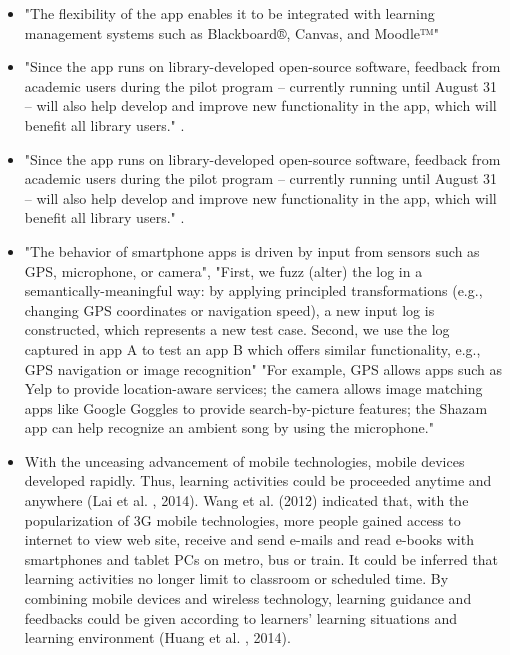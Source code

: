     \begin{itemize}
    
        \item
        "The flexibility of the app enables it to be integrated with learning management systems such as Blackboard®, Canvas, and Moodle™" \cite{campusM}
        \item
        "Since the app runs on library-developed open-source software, feedback from academic users during the pilot program – currently running until August 31 – will also help develop and improve new functionality in the app, which will benefit all library users." \cite{NYU_Library}.
        \item
        "Since the app runs on library-developed open-source software, feedback from academic users during the pilot program – currently running until August 31 – will also help develop and improve new functionality in the app, which will benefit all library users." \cite{NYU_Library}.
        \item 
        "The behavior of smartphone apps is driven by input from
        sensors such as GPS, microphone, or camera", 
        "First, we fuzz (alter) the log in a semantically-meaningful way: by applying 
        principled transformations (e.g., changing GPS coordinates
        or navigation speed), a new input log is constructed, which
        represents a new test case. Second, we use the log captured
        in app A to test an app B which offers similar functionality,
        e.g., GPS navigation or image recognition"
        "For example, GPS allows apps such as Yelp to provide location-aware services; the camera allows image matching apps like Google Goggles to provide search-by-picture features; the Shazam app can help recognize an ambient song by using the microphone."
        \cite{FuzzyAndCross}
        \item
        With the unceasing advancement of mobile technologies, mobile devices developed rapidly. Thus, learning activities could be proceeded anytime and anywhere (Lai et al. , 2014). Wang et al. (2012) indicated that, with the popularization of 3G mobile technologies, more people gained access to internet to view web site, receive and send e-mails and read e-books with smartphones and tablet PCs on metro, bus or train. It could be inferred that learning activities no longer limit to classroom or scheduled time. By combining mobile devices and wireless technology, learning guidance and feedbacks could be given according to learners' learning situations and learning environment (Huang et al. , 2014).


\end{itemize}
